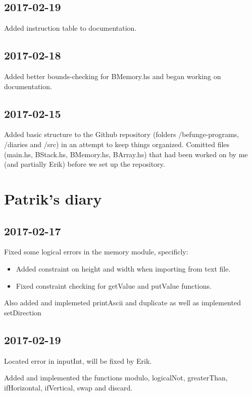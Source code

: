 \documentclass[12pt, a4paper]{article}
\begin{document}
\subsection*{2017-02-19}

Added instruction table to documentation.

\subsection*{2017-02-18}

Added better bounds-checking for BMemory.hs and began working on documentation.

\subsection*{2017-02-15}

Added basic structure to the Github repository (folders /befunge-programs, /diaries and /src) in an attempt to keep things organized. Comitted files (main.hs, BStack.hs, BMemory.hs, BArray.hs) that had been worked on by me (and partially Erik) before we set up the repository.

\section*{Patrik's diary}

\subsection*{2017-02-17}

Fixed some logical errors in the memory module, specificly:
\begin{itemize}
\item Added constraint on height and width when importing from text file.
\item Fixed constraint checking for getValue and putValue functions.
\end{itemize}

Also added and implemeted printAscii and duplicate as well as implemented setDirection

\subsection*{2017-02-19}

Located error in inputInt, will be fixed by Erik.

Added and implemented the functions modulo, logicalNot, greaterThan, ifHorizontal, ifVertical, swap and discard.
\end{document}
